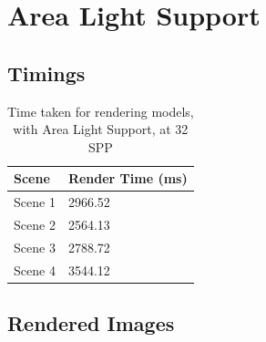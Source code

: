 \documentclass[a4paper]{myarticle}
\begin{document}
\section{Area Light Support}

\subsection{Timings}

\begin{table}[H]
\centering
\renewcommand{\arraystretch}{1.5}
\begin{tabularx}{\linewidth}{LL}
\hline
Scene & Render Time (ms) \\
\hline
Scene 1 & 2966.52 \\
Scene 2 & 2564.13 \\
Scene 3 & 2788.72 \\
Scene 4 & 3544.12 \\
\hline
\end{tabularx}
\caption{Time taken for rendering models, with Area Light Support, at 32 SPP}
\end{table}

\subsection{Rendered Images}
\end{document}
